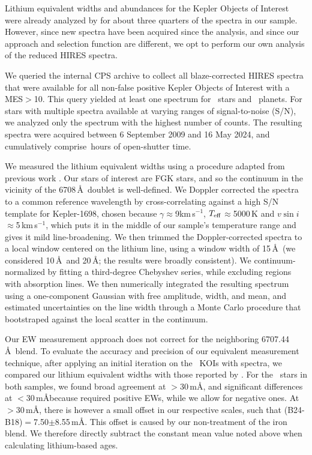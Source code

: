 \documentclass[11pt,twocolumn,tighten]{aastex63}
\newcommand{\kms}{{km\,s$^{-1}$}}
\begin{document}
Lithium equivalent widths and abundances for the Kepler Objects of
Interest were already analyzed by \citet{2018ApJ...855..115B} for
about three quarters of the spectra in our sample.  However, since new
spectra have been acquired since the \citeauthor{2018ApJ...855..115B}
analysis, and since our approach and selection function are different,
we opt to perform our own analysis of the reduced HIRES spectra.

We queried the internal CPS archive to collect all blaze-corrected
HIRES spectra that were available for all non-false positive Kepler
Objects of Interest with a MES$>$10.  This query yielded at least one
spectrum for \nlithiumstars\ stars and \nlithiumplanets\ planets.  For
stars with multiple spectra available at varying ranges of
signal-to-noise (S/N), we analyzed only the spectrum with the highest
number of counts.  The resulting spectra were acquired between 6
September 2009 and 16 May 2024, and cumulatively comprise
\nhireshours\,hours of open-shutter time.

We measured the lithium equivalent widths using a procedure
adapted from previous work \citep{Bouma_2021}.  Our stars of interest
are FGK stars, and so the continuum in the vicinity of the 
6708\,\AA\ doublet is well-defined.  We Doppler corrected the spectra
to a common reference wavelength by cross-correlating against a high
S/N template for Kepler-1698, chosen because $\gamma$$\approx$9\kms,
$T_{\rm eff}$$\approx$5000\,K and $v\sin i$$\approx$5\,\kms, which
puts it in the middle of our sample's temperature range and gives it
mild line-broadening.  We then trimmed the Doppler-corrected spectra
to a local window centered on the lithium line, using a window width
of 15\,\AA\ (we considered 10\,\AA\ and 20\,\AA; the results were
broadly consistent).  We continuum-normalized by fitting a
third-degree Chebyshev series, while excluding regions with
absorption lines.  We then numerically integrated the resulting
spectrum using a one-component Gaussian with free amplitude, width,
and mean, and estimated uncertainties on the line width through a
Monte Carlo procedure that bootstraped against the local scatter in
the continuum.

Our EW measurement approach does not correct for the neighboring
 6707.44\,\AA\ blend.  To evaluate the accuracy and
precision of our equivalent measurement technique, after applying an
initial iteration on the \nlithiumstars\ KOIs with spectra, we
compared our lithium equivalent widths with those reported by
\citet{2018ApJ...855..115B}.  For the \nbergeroverlap\ stars in both
samples, we found broad agreement at $>$30\,m\AA, and significant
differences at $<$30\,m\AA because \citet{2018ApJ...855..115B}
required positive EWs, while we allow for negative ones.  At
$>$30\,m\AA, there is however a small offset in our respective
scales, such that (B24-B18)$=$7.50$\pm$8.55\,m\AA.  This offset is
caused by our non-treatment of the iron blend.  We therefore directly
subtract the constant mean value noted above when calculating
lithium-based ages.
\end{document}
